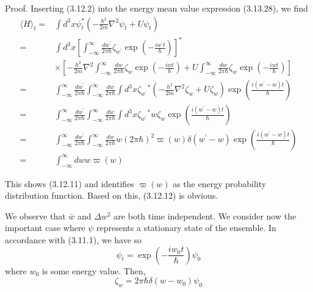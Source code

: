 \documentclass{article}
\begin{document}
Proof. Inserting (3.12.2) into the energy mean value expression (3.13.28), we find
$$
\begin{align*}
\langle H\rangle_{t}= & \int d^{3} x \psi_{t}^{*}\left(-\frac{\hbar^{2}}{2 m} \nabla^{2} \psi_{t}+U \psi_{t}\right)  \tag{3.12.13}\\
= & \int d^{3} x\left[\int_{-\infty}^{\infty} \frac{d w^{\prime}}{2 \pi \hbar} \zeta_{w^{\prime}} \exp \left(-\frac{i w^{\prime} t}{\hbar}\right)\right]^{*} \\
& \times\left[-\frac{\hbar^{2}}{2 m} \nabla^{2} \int_{-\infty}^{\infty} \frac{d w}{2 \pi \hbar} \zeta_{w} \exp \left(-\frac{i w t}{\hbar}\right)+U \int_{-\infty}^{\infty} \frac{d w}{2 \pi \hbar} \zeta_{w} \exp \left(-\frac{i w t}{\hbar}\right)\right] \\
= & \int_{-\infty}^{\infty} \frac{d w^{\prime}}{2 \pi \hbar} \int_{-\infty}^{\infty} \frac{d w}{2 \pi \hbar} \int d^{3} x \zeta_{w^{\prime}}{ }^{*}\left(-\frac{\hbar^{2}}{2 m} \nabla^{2} \zeta_{w}+U \zeta_{w}\right) \exp \left(\frac{i\left(w^{\prime}-w\right) t}{\hbar}\right) \\
= & \int_{-\infty}^{\infty} \frac{d w^{\prime}}{2 \pi \hbar} \int_{-\infty}^{\infty} \frac{d w}{2 \pi \hbar} \int d^{3} x \zeta_{w^{\prime}}{ }^{*} w \zeta_{w} \exp \left(\frac{i\left(w^{\prime}-w\right) t}{\hbar}\right) \\
= & \int_{-\infty}^{\infty} \frac{d w^{\prime}}{2 \pi \hbar} \int_{-\infty}^{\infty} \frac{d w}{2 \pi \hbar} w(2 \pi \hbar)^{2} \varpi(w) \delta\left(w^{\prime}-w\right) \exp \left(\frac{i\left(w^{\prime}-w\right) t}{\hbar}\right) \\
= & \int_{-\infty}^{\infty} d w w \varpi(w)
\end{align*}
$$

This shows (3.12.11) and identifies $\varpi(w)$ as the energy probability distribution function. Based on this, (3.12.12) is obvious.

We observe that $\bar{w}$ and $\Delta w^{2}$ are both time independent.
We consider now the important case where $\psi$ represents a stationary state of the ensemble. In accordance with (3.11.1), we have so
$$
\begin{equation*}
\psi_{t}=\exp \left(-\frac{i w_{0} t}{\hbar}\right) \psi_{0} \tag{3.12.14}
\end{equation*}
$$
where $w_{0}$ is some energy value. Then,
$$
\begin{equation*}
\zeta_{w}=2 \pi \hbar \delta\left(w-w_{0}\right) \psi_{0} \tag{3.12.15}
\end{equation*}
$$
\end{document}
